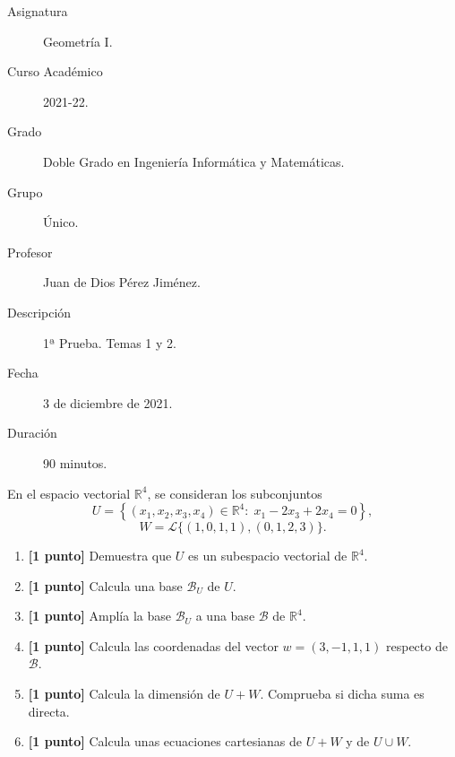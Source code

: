 \documentclass[12pt]{article}
\begin{document}

    
    

    \begin{description}
        \item[Asignatura] Geometría I.
        \item[Curso Académico] 2021-22.
        \item[Grado] Doble Grado en Ingeniería Informática y Matemáticas.
        \item[Grupo] Único.
        \item[Profesor] Juan de Dios Pérez Jiménez.
        \item[Descripción] 1ª Prueba. Temas 1 y 2.
        \item[Fecha] 3 de diciembre de 2021.
        \item[Duración] 90 minutos.
    
    \end{description}
    \newpage
    

    \begin{ejercicio}
    En el espacio vectorial $\mathbb{R}^4$, se consideran los subconjuntos
    $$ U = \left\{ \left( x_1, x_2, x_3, x_4\right) \in \mathbb{R}^4 :\; x_1 - 2x_3 + 2x_4 = 0 \right\}, $$
    $$ W = \mathcal{L}\{(1,0,1,1),(0,1,2,3)\}. $$

    \begin{enumerate}
        \item \textbf{[1 punto]} Demuestra que $U$ es un subespacio vectorial de $\mathbb{R}^4$.
        \item \textbf{[1 punto]} Calcula una base $\mathcal{B}_U$ de $U$.
        \item \textbf{[1 punto]} Amplía la base $\mathcal{B}_U$ a una base $\mathcal{B}$ de $\mathbb{R}^4$.
        \item \textbf{[1 punto]} Calcula las coordenadas del vector $w = (3, -1, 1, 1)$ respecto de $\mathcal{B}$.
        \item \textbf{[1 punto]} Calcula la dimensión de $U+W$. Comprueba si dicha suma es directa.
        \item \textbf{[1 punto]} Calcula unas ecuaciones cartesianas de $U+W$ y de $U\cup W$.
    \end{enumerate}
    \end{ejercicio}
\end{document}
